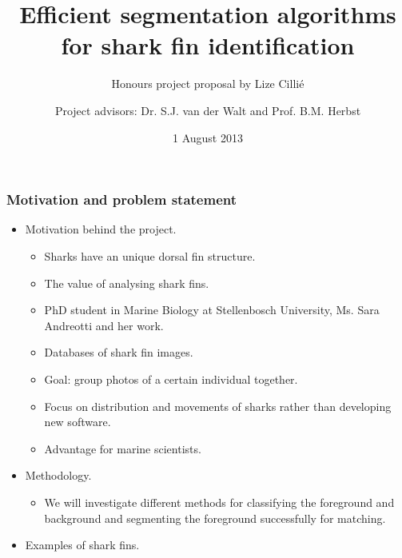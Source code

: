 \documentclass{beamer}
\title{Efficient segmentation algorithms for shark fin identification}
\subtitle{Honours project proposal by Lize Cilli\'{e}}
\author{Project advisors: Dr. S.J. van der Walt and Prof. B.M.
Herbst}
\date{1 August 2013}
\institute{Division of Applied Mathematics, Stellenbosch University}
\newcommand{\myitem}{\item[$-$]}
\begin{document}
\maketitle


\begin{frame}
\frametitle{Motivation and problem statement}
\begin{itemize}

\item Motivation behind the project.
\begin{itemize}
\myitem Sharks have an unique dorsal fin structure.
\myitem The value of analysing shark fins.
\myitem PhD student in Marine Biology at Stellenbosch University, Ms. Sara
Andreotti and her work.
\myitem Databases of shark fin images.
\myitem Goal: group photos of a certain individual together.
\myitem Focus on distribution and movements of sharks rather than developing new software.
\myitem Advantage for marine scientists.
\end{itemize}
\item Methodology.
\begin{itemize}
 \myitem We will investigate different methods for classifying the foreground and
background and segmenting the foreground successfully for matching. 
\end{itemize}

\item Examples of shark fins.
\end{itemize}
\end{frame}
\end{document}
